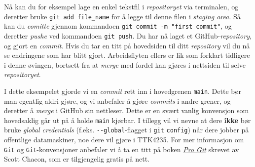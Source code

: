 Nå kan du for eksempel lage en enkel tekstfil i \textit{repositoryet} via terminalen, og deretter bruke \verb|git add file_name| for å legge til denne filen i \textit{staging area}. Så kan du \textit{comitte} gjennom kommandoen \verb|git commit -m "first commit"|, og deretter \textit{pushe} ved kommandoen \verb|git push|. Du har nå laget et GitHub-\textit{repository}, og gjort en \textit{commit}. Hvis du tar en titt på hovedsiden til ditt \textit{repository} vil du nå se endringene som har blitt gjort. Arbeidsflyten ellers er lik som forklart tidligere i denne øvingen, bortsett fra at \textit{merge} med fordel kan gjøres i nettsiden til selve \textit{repositoryet}.

I dette eksempelet gjorde vi en \textit{commit} rett inn i hovedgrenen \verb|main|. Dette bør man egentlig aldri gjøre, og vi anbefaler å gjøre \textit{commits} i andre grener, og deretter å \textit{merge} i GitHub sin nettleser. Dette er en svært vanlig konvensjon som hovedsaklig går ut på å holde \verb|main| kjørbar. I tillegg vil vi nevne at dere {\bf{ikke}} bør bruke \textit{global credentials} (f.eks. \verb|--global|-flagget i \verb|git| \verb|config|) når dere jobber på offentlige datamaskiner, noe dere vil gjøre i TTK4235. For mer informasjon om \verb|Git| og \verb|Git|-konvensjoner anbefaler vi å ta en titt på boken \href{https://git-scm.com/book/en/v2}{\it Pro Git} skrevet av Scott Chacon, som er tilgjengelig gratis på nett.





